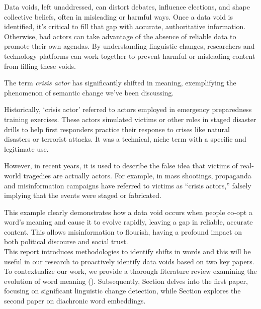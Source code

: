 Data voids, left unaddressed, can distort debates, influence elections, and shape collective beliefs, often in misleading or harmful ways.
Once a data void is identified, it’s critical to fill that gap with accurate, authoritative information.
Otherwise, bad actors can take advantage of the absence of reliable data to promote their own agendas.
By understanding linguistic changes, researchers and technology platforms can work together to prevent harmful or misleading content from filling these voids.

The term \emph{crisis actor} has significantly shifted in meaning,
exemplifying the phenomenon of semantic change we've been discussing.

Historically, `crisis actor' referred to actors employed in emergency preparedness training exercises.
These actors simulated victims or other roles in staged disaster drills to help first responders practice their response to crises like natural disasters or terrorist attacks.
It was a technical, niche term with a specific and legitimate use.

However, in recent years, it is used to describe the false idea that victims of real-world tragedies are actually actors.
For example, in mass shootings, propaganda and misinformation campaigns have referred to victims as “crisis actors,” falsely implying that the events were staged or fabricated.

This example clearly demonstrates how a data void occurs when people co-opt a word’s meaning and cause it to evolve rapidly,
leaving a gap in reliable, accurate content.
This allows misinformation to flourish, having a profound impact on both political discourse and social trust.\\

This report introduces methodologies to identify shifts in words and this will be useful in our research to proactively identify data voids based on two key papers.
To contextualize our work, we provide a thorough literature review examining the evolution of word meaning ().
Subsequently, Section  delves into the first paper, focusing on significant linguistic change detection,
while Section  explores the second paper on diachronic word embeddings.















